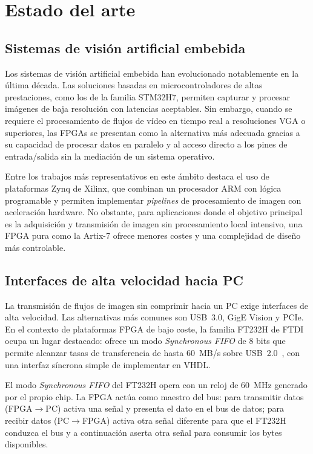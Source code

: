 \documentclass[../main.tex]{subfiles}
\begin{document}
\chapter{Estado del arte}
\label{chap:estado_del_arte}

\section{Sistemas de visión artificial embebida}

Los sistemas de visión artificial embebida han evolucionado notablemente en la última década. Las soluciones basadas en microcontroladores de altas prestaciones, como los de la familia STM32H7, permiten capturar y procesar imágenes de baja resolución con latencias aceptables. Sin embargo, cuando se requiere el procesamiento de flujos de vídeo en tiempo real a resoluciones \ac{VGA} o superiores, las \ac{FPGA}s se presentan como la alternativa más adecuada gracias a su capacidad de procesar datos en paralelo y al acceso directo a los pines de entrada/salida sin la mediación de un sistema operativo.

Entre los trabajos más representativos en este ámbito destaca el uso de plataformas Zynq de Xilinx, que combinan un procesador ARM con lógica programable y permiten implementar \textit{pipelines} de procesamiento de imagen con aceleración hardware. No obstante, para aplicaciones donde el objetivo principal es la adquisición y transmisión de imagen sin procesamiento local intensivo, una \ac{FPGA} pura como la Artix-7 ofrece menores costes y una complejidad de diseño más controlable.

\section{Interfaces de alta velocidad hacia PC}

La transmisión de flujos de imagen sin comprimir hacia un PC exige interfaces de alta velocidad. Las alternativas más comunes son USB~3.0, GigE Vision y PCIe. En el contexto de plataformas \ac{FPGA} de bajo coste, la familia FT232H de FTDI ocupa un lugar destacado: ofrece un modo \textit{Synchronous FIFO} de 8 bits que permite alcanzar tasas de transferencia de hasta 60~MB/s sobre USB~2.0~\cite{ft232h_datasheet}, con una interfaz síncrona simple de implementar en \ac{VHDL}.

El modo \textit{Synchronous FIFO} del FT232H opera con un reloj de 60~MHz generado por el propio chip. La FPGA actúa como maestro del bus: para transmitir datos (FPGA$\rightarrow$PC) activa una señal y presenta el dato en el bus de datos; para recibir datos (PC$\rightarrow$FPGA) activa otra señal diferente para que el FT232H conduzca el bus y a continuación aserta otra señal para consumir los bytes disponibles.
\end{document}

